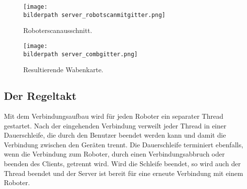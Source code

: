 \begin{figure}[H]
	\begin{minipage}[b]{8cm} 	
	\centering
	\texttt{[image: \\bilderpath server\_robotscanmitgitter.png]}
	\caption{Roboterscanausschnitt.}
	\label{serv:fig:roboterscan}
	\end{minipage}
	\hfill	
	\begin{minipage}[b]{8cm} 
	\centering	
	\texttt{[image: \\bilderpath server\_combgitter.png]}
	\caption{Resultierende Wabenkarte.}
	\label{serv:fig:wabenkarte}
	\end{minipage}
\end{figure}

\subsection{Der Regeltakt}\label{serv:regeltakt}

Mit dem Verbindungsaufbau wird für jeden Roboter ein separater Thread gestartet. Nach der eingehenden Verbindung verweilt jeder Thread in einer Dauerschleife, die durch den Benutzer beendet werden kann und damit die Verbindung zwischen den Geräten trennt. Die Dauerschleife terminiert ebenfalls, wenn die Verbindung zum Roboter, durch einen Verbindungsabbruch oder beenden des Clients, getrennt wird. Wird die Schleife beendet, so wird auch der Thread beendet und der Server ist bereit für eine erneute Verbindung mit einem Roboter. \\

